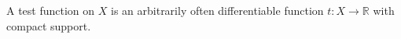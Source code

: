 A test function on $X$ is an arbitrarily often differentiable function $t: X \to \mathbb{R}$ with compact support.

